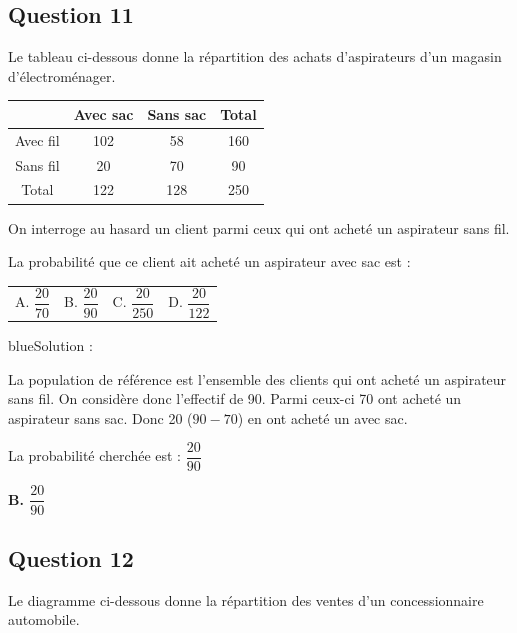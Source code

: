 \documentclass[10pt]{article}
\begin{document}
\subsection*{Question 11}

Le tableau ci-dessous donne la répartition des achats d'aspirateurs d'un magasin d'électroménager.
\begin{center}
\renewcommand{\arraystretch}{1.25}
\begin{tabular}{|c|c|c|c|}\hline
& Avec sac & Sans sac & Total\\\hline
Avec fil & 102 & 58 & 160\\\hline
Sans fil & 20 & 70 & 90\\\hline
Total & 122 & 128 & 250\\\hline
\end{tabular}
\end{center}

On interroge au hasard un client parmi ceux qui ont acheté un aspirateur sans fil.\par
La probabilité que ce client ait acheté un aspirateur avec sac est :
\begin{center}
\begin{tabularx}{.92\linewidth}{XXXX} A. $\dfrac{20}{70}$ & B. $\dfrac{20}{90}$ & C. $\dfrac{20}{250}$ & D. $\dfrac{20}{122}$\end{tabularx}
\end{center}

\begin{color}{blue}Solution :\par
La population de référence est l'ensemble des clients qui ont acheté un aspirateur sans fil. On considère donc l'effectif de 90. Parmi ceux-ci 70 ont acheté un aspirateur sans sac. Donc 20 ($90-70$) en ont acheté un avec sac.

La probabilité cherchée est : $\dfrac{20}{90}$

\textbf{B. $\dfrac{20}{90}$}
\end{color}


\subsection*{Question 12}

Le diagramme ci-dessous donne la répartition des ventes d'un concessionnaire automobile.
\begin{center}
\end{center}
\end{document}

